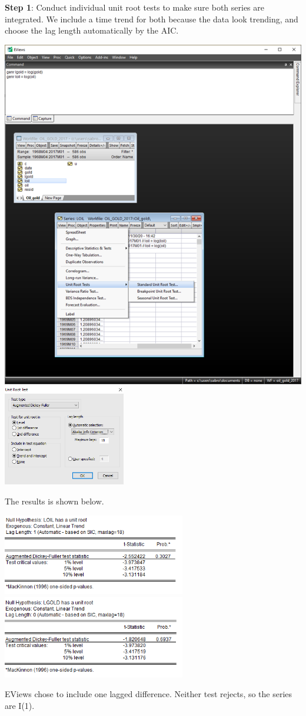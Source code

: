 \documentclass[11pt, a4paper]{article}
\begin{document}
\begin{enumerate}
\begin{enumerate}
\noindent\textbf{Step 1}: Conduct individual unit root tests to make sure both series are integrated. We include a time trend for both because the data look trending, and choose the lag length automatically by the AIC.
\begin{center}
\includegraphics[width=.8\textwidth]{adfeviews}
\includegraphics[width=0.4\textwidth]{adfeviews2}
\end{center}

The results is shown below.
\begin{center}
\includegraphics[width=0.6\textwidth]{ADF_loil}
\includegraphics[width=0.6\textwidth]{ADF_lgold}
\end{center}
EViews chose to include one lagged difference. Neither test rejects, so the series are I(1).


\end{enumerate}
\end{enumerate}
\end{document}
